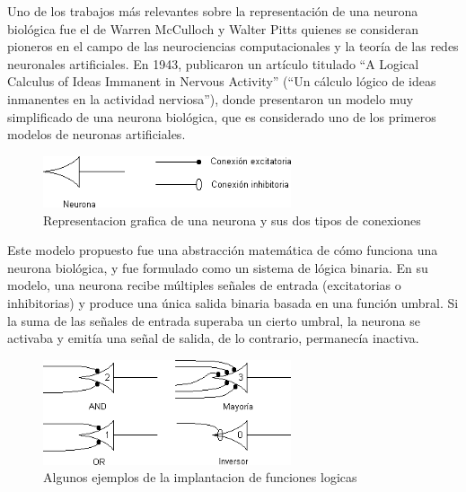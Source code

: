 Uno de los trabajos más relevantes sobre la representación de una neurona biológica fue el de Warren McCulloch y Walter Pitts quienes se consideran  pioneros en el campo de las neurociencias computacionales y la teoría de las redes neuronales artificiales. En 1943, publicaron un artículo titulado ``A Logical Calculus of Ideas Immanent in Nervous Activity'' (``Un cálculo lógico de ideas inmanentes en la actividad nerviosa''), donde presentaron un modelo muy simplificado de una neurona biológica, que es considerado uno de los primeros modelos de neuronas artificiales\cite{mcculloch1943logical}.

\begin{figure}
	\includegraphics[width=0.65\textwidth]{capitulo2/figuras/an2.png}
	\caption{Representacion grafica de una neurona y sus dos tipos de conexiones}
	\label{fig:an2}
\end{figure}

Este modelo propuesto  fue una abstracción matemática de cómo funciona una neurona biológica, y fue formulado como un sistema de lógica binaria. En su modelo, una neurona recibe múltiples señales de entrada (excitatorias o inhibitorias) y produce una única salida binaria basada en una función umbral. Si la suma de las señales de entrada superaba un cierto umbral, la neurona se activaba y emitía una señal de salida, de lo contrario, permanecía inactiva.

\begin{figure}[h!]
	\includegraphics[width=0.65\textwidth]{capitulo2/figuras/an3.png}
	\caption{Algunos ejemplos de la implantacion de funciones logicas}
	\label{fig:an3}
\end{figure}

